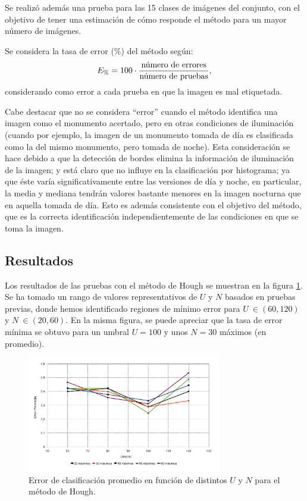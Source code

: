 \documentclass[conference,a4paper,10pt,oneside,final]{tfmpd}
\begin{document}
Se realizó además una prueba para las 15 clases de imágenes %
del conjunto,
con el objetivo de tener una estimación de cómo responde %
el método para un mayor número de imágenes.

Se considera la tasa de error ($\%$) del método según:
\begin{equation}
E_\%=100\cdot\frac{\textrm{número de errores}}{\textrm{número de pruebas}},
\end{equation}
considerando como error a cada prueba en que la imagen es mal etiquetada.

Cabe destacar que no se considera %
``error'' %
cuando el método identifica
una imagen como el monumento acertado, pero en otras
condiciones de iluminación (cuando por ejemplo, la imagen de un monumento
tomada de día es clasificada como la del mismo monumento, pero tomada de noche).
Esta consideración se hace debido a que la detección de bordes elimina la
información de iluminación de la imagen; y está claro que no influye
en la clasificación por histograma; ya que éste varía significativamente
entre las versiones de día y noche, en particular, la media y mediana tendrán
valores bastante menores en la imagen nocturna que en aquella tomada de día.
Esto es además consistente con el objetivo del método, que es la correcta
identificación independientemente de las condiciones en que se toma la imagen.
%
%
\subsection{Resultados}

Los resultados de las pruebas con el método de Hough se muestran en la figura
\ref{graficaerror}. Se ha tomado un rango de valores representativos de $U$
y $N$ basados en pruebas previas, donde hemos identificado regiones de mínimo
error para $U~\in(60,120)$ y $N~\in(20,60)$.
En la misma figura, se puede apreciar que la tasa de error mínima se obtuvo
para un umbral $U = 100$ y unos $N = 30$ máximos (en promedio).

\begin{figure}
\begin{center}
\includegraphics[width=8.5cm]{../diagramas/estadistica_noche_iguales} 
\end{center}
\caption{Error de clasificación promedio en función de distintos $U$ y $N$ para
el método de Hough.}
\label{graficaerror}
\end{figure}
\end{document}
